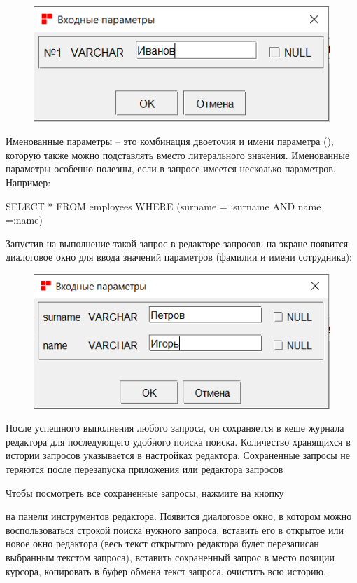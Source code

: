 \begin{figure}[H]
	\centering
	\includegraphics[width = 0.4\linewidth]{img/input_param.png}
\end{figure}

Именованные параметры -- это комбинация двоеточия и имени параметра (), которую также можно подставлять вместо литерального значения. Именованные параметры особенно полезны, если в запросе имеется несколько параметров. Например:

\begin{redexample}\ttfamily
	SELECT * FROM employees WHERE (surname = :surname AND name =:name)  
\end{redexample}

Запустив на выполнение такой запрос в редакторе запросов, на экране появится диалоговое окно для ввода значений параметров (фамилии и имени сотрудника):

\begin{figure}[H]
	\centering
	\includegraphics[width = 0.4\linewidth]{img/input_param2.png}
\end{figure}

\label{sec:query_history}

После успешного выполнения любого запроса, он сохраняется в кеше журнала редактора для последующего удобного поиска поиска. Количество хранящихся в истории запросов указывается в настройках редактора. Сохраненные запросы не теряются после перезапуска приложения или редактора запросов

Чтобы посмотреть все сохраненные запросы, нажмите на кнопку 
на панели инструментов редактора. Появится диалоговое окно, в котором можно воспользоваться строкой поиска нужного запроса, вставить его в открытое или новое окно редактора (весь текст открытого редактора будет перезаписан выбранным текстом запроса), вставить сохраненный запрос в место позиции курсора, копировать в буфер обмена текст запроса, очистить всю историю. 

